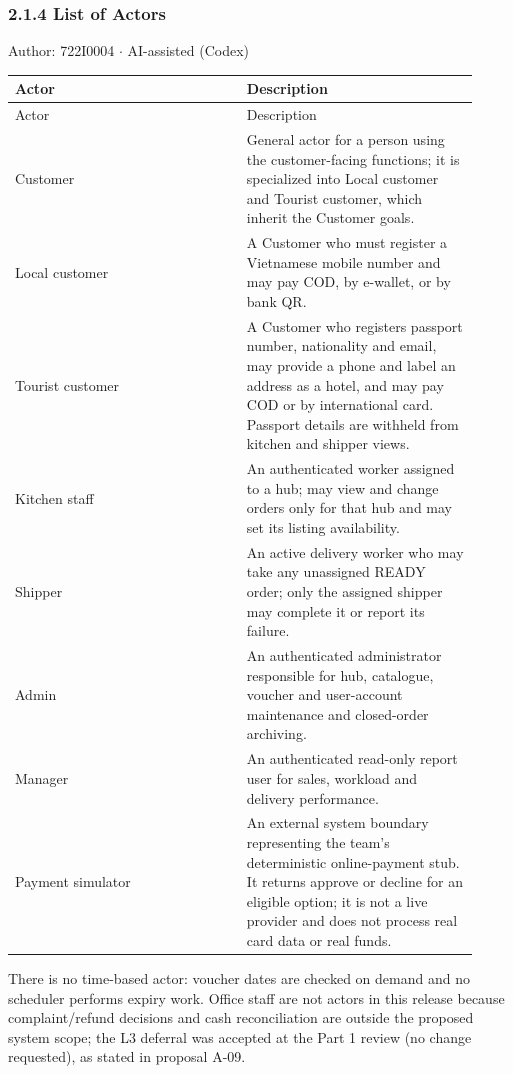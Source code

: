 \subsubsection*{2.1.4 List of Actors}
Author: 722I0004 \ensuremath{\cdot} AI-assisted (Codex)

\begin{longtable}{>{\raggedright\arraybackslash}p{0.4600\linewidth}>{\raggedright\arraybackslash}p{0.4600\linewidth}}
Actor & Description \\
\hline\endfirsthead
Actor & Description \\
\hline\endhead
Customer & General actor for a person using the customer-facing functions; it is specialized into Local customer and Tourist customer, which inherit the Customer goals. \\
Local customer & A Customer who must register a Vietnamese mobile number and may pay COD, by e-wallet, or by bank QR. \\
Tourist customer & A Customer who registers passport number, nationality and email, may provide a phone and label an address as a hotel, and may pay COD or by international card. Passport details are withheld from kitchen and shipper views. \\
Kitchen staff & An authenticated worker assigned to a hub; may view and change orders only for that hub and may set its listing availability. \\
Shipper & An active delivery worker who may take any unassigned READY order; only the assigned shipper may complete it or report its failure. \\
Admin & An authenticated administrator responsible for hub, catalogue, voucher and user-account maintenance and closed-order archiving. \\
Manager & An authenticated read-only report user for sales, workload and delivery performance. \\
Payment simulator & An external system boundary representing the team's deterministic online-payment stub. It returns approve or decline for an eligible option; it is not a live provider and does not process real card data or real funds. \\
\end{longtable}
There is no time-based actor: voucher dates are checked on demand and no scheduler performs expiry work. Office staff are not actors in this release because complaint/refund decisions and cash reconciliation are outside the proposed system scope; the L3 deferral was accepted at the Part 1 review (no change requested), as stated in proposal A-09.
